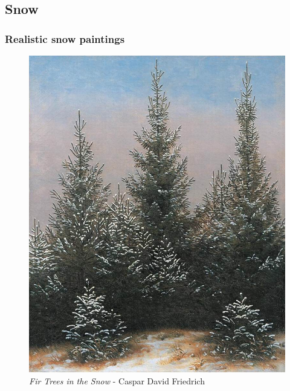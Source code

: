 \documentclass[a4paper]{article}
\begin{document}
\newpage
\subsection{Snow}

\subsubsection{Realistic snow paintings}
\begin {figure}[h!]
\centering
\begin{minipage}[b]{.49\textwidth}
	\centering
	\includegraphics[width=\textwidth]{SnowPaintings/R1friedrichfirtreesinthesnow.jpg}
    \caption{\emph{Fir Trees in the Snow} - Caspar David Friedrich}
\end{minipage}
\hfill
\begin{minipage}[b]{.49\textwidth}
	\centering

\end{minipage}
\end{figure}
\end{document}
